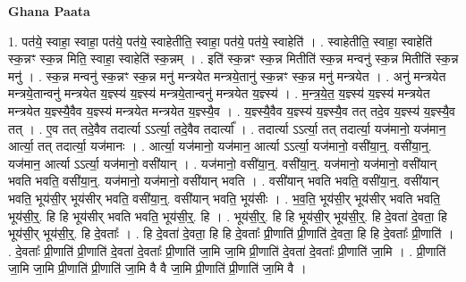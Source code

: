 \documentclass[17pt]{extarticle}
\begin{document}
\textbf{Ghana Paata } \newline

1. पत॑ये॒ स्वाहा॒ स्वाहा॒ पत॑ये॒ पत॑ये॒ स्वाहेतीति॒ स्वाहा॒ पत॑ये॒ पत॑ये॒ स्वाहेति॑ । . स्वाहेतीति॒ स्वाहा॒ स्वाहेति॑ स्क॒न्नꣳ स्क॒न्न मिति॒ स्वाहा॒ स्वाहेति॑ स्क॒न्नम् । . इति॑ स्क॒न्नꣳ स्क॒न्न मितीति॑ स्क॒न्न मन्वनु॑ स्क॒न्न मितीति॑ स्क॒न्न मनु॑ । . स्क॒न्न मन्वनु॑ स्क॒न्नꣳ स्क॒न्न मनु॑ मन्त्रयेत मन्त्रये॒तानु॑ स्क॒न्नꣳ स्क॒न्न मनु॑ मन्त्रयेत । . अनु॑ मन्त्रयेत मन्त्रये॒तान्वनु॑ मन्त्रयेत य॒ज्ञ्स्य॑ य॒ज्ञ्स्य॑ मन्त्रये॒तान्वनु॑ मन्त्रयेत य॒ज्ञ्स्य॑ । . म॒न्त्र॒ये॒त॒ य॒ज्ञ्स्य॑ य॒ज्ञ्स्य॑ मन्त्रयेत मन्त्रयेत य॒ज्ञ्स्यै॒वैव य॒ज्ञ्स्य॑ मन्त्रयेत मन्त्रयेत य॒ज्ञ्स्यै॒व । . य॒ज्ञ्स्यै॒वैव य॒ज्ञ्स्य॑ य॒ज्ञ्स्यै॒व तत् तदे॒व य॒ज्ञ्स्य॑ य॒ज्ञ्स्यै॒व तत् । . ए॒व तत् तदे॒वैव तदार्त्या ऽऽर्त्या॒ तदे॒वैव तदार्त्या᳚ । . तदार्त्या ऽऽर्त्या॒ तत् तदार्त्या॒ यज॑मानो॒ यज॑मान॒ आर्त्या॒ तत् तदार्त्या॒ यज॑मानः । . आर्त्या॒ यज॑मानो॒ यज॑मान॒ आर्त्या ऽऽर्त्या॒ यज॑मानो॒ वसी॑या॒न्॒. वसी॑या॒न्॒. यज॑मान॒ आर्त्या ऽऽर्त्या॒ यज॑मानो॒ वसी॑यान् । . यज॑मानो॒ वसी॑या॒न्॒. वसी॑या॒न्॒. यज॑मानो॒ यज॑मानो॒ वसी॑यान् भवति भवति॒ वसी॑या॒न्॒. यज॑मानो॒ यज॑मानो॒ वसी॑यान् भवति । . वसी॑यान् भवति भवति॒ वसी॑या॒न्॒. वसी॑यान् भवति॒ भूय॑सी॒र् भूय॑सीर् भवति॒ वसी॑या॒न्॒. वसी॑यान् भवति॒ भूय॑सीः । . भ॒व॒ति॒ भूय॑सी॒र् भूय॑सीर् भवति भवति॒ भूय॑सी॒र्॒. हि हि भूय॑सीर् भवति भवति॒ भूय॑सी॒र्॒. हि । . भूय॑सी॒र्॒. हि हि भूय॑सी॒र् भूय॑सी॒र्॒. हि दे॒वता॑ दे॒वता॒ हि भूय॑सी॒र् भूय॑सी॒र्॒. हि दे॒वताः᳚ । . हि दे॒वता॑ दे॒वता॒ हि हि दे॒वताः᳚ प्री॒णाति॑ प्री॒णाति॑ दे॒वता॒ हि हि दे॒वताः᳚ प्री॒णाति॑ । . दे॒वताः᳚ प्री॒णाति॑ प्री॒णाति॑ दे॒वता॑ दे॒वताः᳚ प्री॒णाति॑ जा॒मि जा॒मि प्री॒णाति॑ दे॒वता॑ दे॒वताः᳚ प्री॒णाति॑ जा॒मि । . प्री॒णाति॑ जा॒मि जा॒मि प्री॒णाति॑ प्री॒णाति॑ जा॒मि वै वै जा॒मि प्री॒णाति॑ प्री॒णाति॑ जा॒मि वै । \newline
\end{document}

